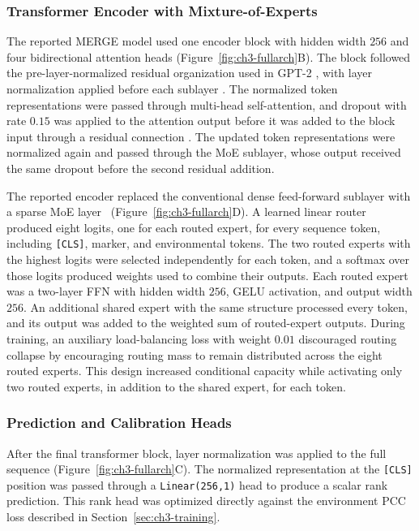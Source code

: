 \subsubsection{Transformer Encoder with Mixture-of-Experts}
The reported MERGE model used one encoder block with hidden width $256$ and four bidirectional attention heads (Figure~\ref{fig:ch3-fullarch}B). The block followed the pre-layer-normalized residual organization used in GPT-2 \cite{gpt2}, with layer normalization applied before each sublayer \cite{layernorm}. The normalized token representations were passed through multi-head self-attention, and dropout with rate $0.15$ was applied to the attention output before it was added to the block input through a residual connection \cite{he2016deep}. The updated token representations were normalized again and passed through the MoE sublayer, whose output received the same dropout before the second residual addition.

The reported encoder replaced the conventional dense feed-forward sublayer with a sparse MoE layer~\cite{shazeer2017outrageously} (Figure~\ref{fig:ch3-fullarch}D). A learned linear router produced eight logits, one for each routed expert, for every sequence token, including \texttt{[CLS]}, marker, and environmental tokens. The two routed experts with the highest logits were selected independently for each token, and a softmax over those logits produced weights used to combine their outputs. Each routed expert was a two-layer FFN with hidden width $256$, GELU activation, and output width $256$. An additional shared expert with the same structure processed every token, and its output was added to the weighted sum of routed-expert outputs. During training, an auxiliary load-balancing loss with weight $0.01$ discouraged routing collapse by encouraging routing mass to remain distributed across the eight routed experts. This design increased conditional capacity while activating only two routed experts, in addition to the shared expert, for each token.

\subsubsection{Prediction and Calibration Heads}
After the final transformer block, layer normalization was applied to the full sequence (Figure~\ref{fig:ch3-fullarch}C). The normalized representation at the \texttt{[CLS]} position was passed through a \texttt{Linear(256,1)} head to produce a scalar rank prediction. This rank head was optimized directly against the environment PCC loss described in Section~\ref{sec:ch3-training}.

